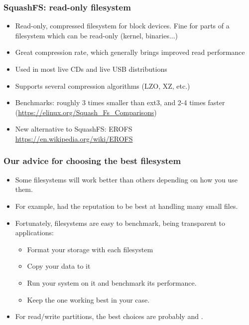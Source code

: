\begin{frame}
  \frametitle{SquashFS: read-only filesystem}
  \begin{itemize}
  \item Read-only, compressed filesystem for block devices. Fine for
    parts of a filesystem which can be read-only (kernel, binaries...)
  \item Great compression rate, which generally brings improved read
    performance
  \item Used in most live CDs and live USB distributions
  \item Supports several compression algorithms (LZO, XZ, etc.)
  \item Benchmarks: roughly 3 times smaller than ext3, and 2-4 times
    faster (\url{https://elinux.org/Squash_Fs_Comparisons})
  \item New alternative to SquashFS: EROFS\\
    \url{https://en.wikipedia.org/wiki/EROFS}
  \end{itemize}
\end{frame}

\begin{frame}
  \frametitle{Our advice for choosing the best filesystem}
  \begin{itemize}
     \item Some filesystems will work better than others
           depending on how you use them.
     \item For example,  had the reputation
           to be best at handling many small files.
     \item Fortunately, filesystems are easy to benchmark, being
           transparent to applications:
           \begin{itemize}
             \item Format your storage with each filesystem
	     \item Copy your data to it
	     \item Run your system on it and benchmark its
                   performance.
	     \item Keep the one working best in your case.
           \end{itemize}
     \item For read/write partitions, the best choices are
           probably  and .
  \end{itemize}
\end{frame}

